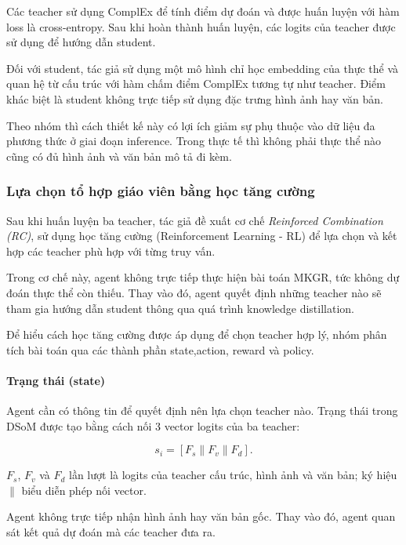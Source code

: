 Các teacher sử dụng ComplEx để tính điểm dự đoán và
được huấn luyện với hàm loss là cross-entropy. Sau khi hoàn thành
huấn luyện, các logits của teacher được sử dụng để
hướng dẫn student.

Đối với student, tác giả sử dụng một mô hình chỉ học
embedding của thực thể và quan hệ từ cấu trúc
với hàm chấm điểm ComplEx tương tự như teacher. Điểm
khác biệt là student không trực tiếp sử dụng đặc trưng
hình ảnh hay văn bản.

Theo nhóm thì cách thiết kế này có lợi ích giảm sự phụ thuộc vào dữ liệu đa phương thức ở giai đoạn inference. Trong thực tế thì không phải thực thể nào cũng có đủ hình ảnh và văn bản mô tả đi kèm. 


\subsubsection{Lựa chọn tổ hợp giáo viên bằng học tăng cường}

Sau khi huấn luyện ba teacher, tác giả đề xuất
cơ chế \textit{Reinforced Combination (RC)}, sử dụng
học tăng cường (Reinforcement Learning - RL)
để lựa chọn và kết hợp các teacher phù hợp
với từng truy vấn.

Trong cơ chế này, agent không trực tiếp thực hiện bài toán MKGR, tức không dự đoán thực thể còn thiếu. Thay vào đó, agent quyết định những teacher nào sẽ tham gia hướng dẫn student thông qua quá trình knowledge distillation.


Để hiểu cách học tăng cường được áp dụng để chọn teacher hợp lý, nhóm phân tích bài toán qua các thành phần state,action, reward và policy.

\paragraph{Trạng thái (state)}


Agent cần có thông tin để quyết định nên lựa chọn teacher nào. Trạng thái trong DSoM được tạo bằng cách nối 3 vector logits của ba teacher:

\begin{equation}
s_i=[F_s\|F_v\|F_d].
\end{equation}

$F_s$, $F_v$ và $F_d$ lần lượt là logits
của teacher cấu trúc, hình ảnh và văn bản; ký hiệu
$\|$ biểu diễn phép nối vector.

Agent không trực tiếp nhận hình ảnh hay văn bản gốc. Thay vào đó, agent quan sát
kết quả dự đoán mà các teacher đưa ra. 

